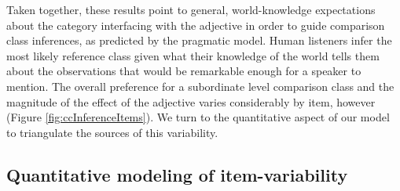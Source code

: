 \documentclass[doc, floatsintext]{apa6}
\begin{document}
Taken together, these results point to general, world-knowledge expectations about the category interfacing with the adjective in order to guide comparison class inferences, as predicted by the pragmatic model.
Human listeners infer the most likely reference class given what their knowledge of the world tells them about the observations that would be remarkable enough for a speaker to mention.
The overall preference for a subordinate level comparison class and the magnitude of the effect of the adjective varies considerably by item, however (Figure \ref{fig:ccInferenceItems}).
We turn to the quantitative aspect of our model to triangulate the sources of this variability.

\subsection{Quantitative modeling of item-variability}

\end{document}
